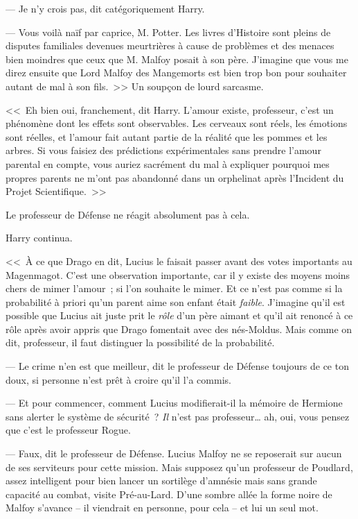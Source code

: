--- Je n'y crois pas, dit catégoriquement Harry.

--- Vous voilà naïf par caprice, M. Potter. Les livres d'Histoire sont pleins de disputes familiales devenues meurtrières à cause de problèmes et des menaces bien moindres que ceux que M. Malfoy posait à son père. J'imagine que vous me direz ensuite que Lord Malfoy des Mangemorts est bien trop bon pour souhaiter autant de mal à son fils.~>> Un soupçon de lourd sarcasme.

<<~Eh bien oui, franchement, dit Harry. L'amour existe, professeur, c'est un phénomène dont les effets sont observables. Les cerveaux sont réels, les émotions sont réelles, et l'amour fait autant partie de la réalité que les pommes et les arbres. Si vous faisiez des prédictions expérimentales sans prendre l'amour parental en compte, vous auriez sacrément du mal à expliquer pourquoi mes propres parents ne m'ont pas abandonné dans un orphelinat après l'Incident du Projet Scientifique.~>>

Le professeur de Défense ne réagit absolument pas à cela.

Harry continua.

<<~À ce que Drago en dit, Lucius le faisait passer avant des votes importants au Magenmagot. C'est une observation importante, car il y existe des moyens moins chers de mimer l'amour~; si l'on souhaite le mimer. Et ce n'est pas comme si la probabilité à priori qu'un parent aime son enfant était \emph{faible}. J'imagine qu'il est possible que Lucius ait juste prit le \emph{rôle} d'un père aimant et qu'il ait renoncé à ce rôle après avoir appris que Drago fomentait avec des nés-Moldus. Mais comme on dit, professeur, il faut distinguer la possibilité de la probabilité.

--- Le crime n'en est que meilleur, dit le professeur de Défense toujours de ce ton doux, si personne n'est prêt à croire qu'il l'a commis.

--- Et pour commencer, comment Lucius modifierait-il la mémoire de Hermione sans alerter le système de sécurité~? \emph{Il} n'est pas professeur… ah, oui, vous pensez que c'est le professeur Rogue.

--- Faux, dit le professeur de Défense. Lucius Malfoy ne se reposerait sur aucun de ses serviteurs pour cette mission. Mais supposez qu'un professeur de Poudlard, assez intelligent pour bien lancer un sortilège d'amnésie mais sans grande capacité au combat, visite Pré-au-Lard. D'une sombre allée la forme noire de Malfoy s'avance -- il viendrait en personne, pour cela -- et lui un seul mot.

